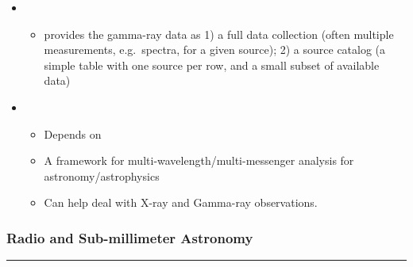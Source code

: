 \documentclass[letterpaper,10pt,english]{sphinxmanual}
\begin{document}
\begin{itemize}
\begin{itemize}
\end{itemize}

\item {} 
\begin{itemize}
\item {} 
 provides the gamma-ray data as 1) a full data
collection (often multiple measurements, e.g. spectra, for a given
source); 2) a source catalog (a simple table with one source per
row, and a small subset of available data)

\end{itemize}

\item {} 
\begin{itemize}
\item {} 
Depends on 

\item {} 
A framework for multi-wavelength/multi-messenger analysis for
astronomy/astrophysics

\item {} 
Can help deal with X-ray and Gamma-ray observations.

\end{itemize}

\end{itemize}


\subsubsection{Radio and Sub-millimeter Astronomy}
\label{\detokenize{resource/astro/topics/radio_submm_astrophy:radio-and-sub-millimeter-astronomy}}\label{\detokenize{resource/astro/topics/radio_submm_astrophy::doc}}


\bigskip\hrule\bigskip
\end{document}
